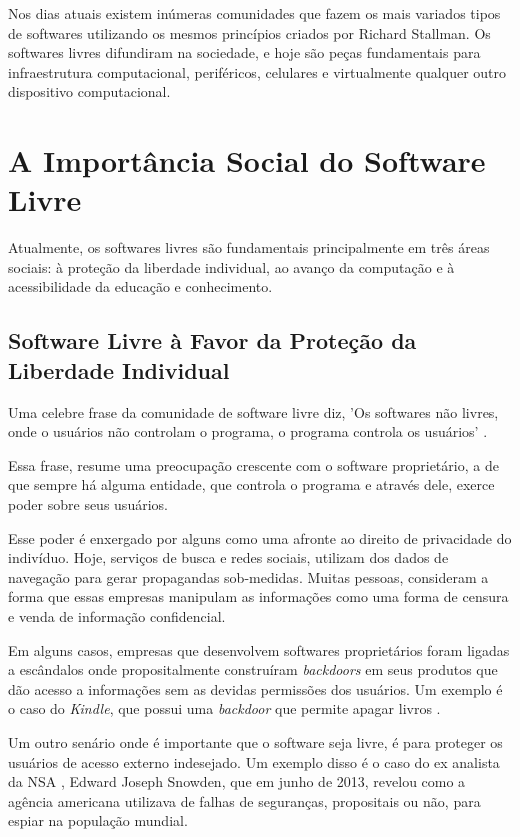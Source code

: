 Nos dias atuais existem inúmeras comunidades que fazem os mais variados tipos de softwares utilizando os mesmos princípios criados por Richard Stallman. Os softwares livres difundiram na sociedade, e hoje são peças fundamentais para infraestrutura computacional, periféricos, celulares e virtualmente qualquer outro dispositivo computacional.

\section{A Importância Social do Software Livre}
Atualmente, os softwares livres são fundamentais principalmente em três áreas sociais: à proteção da liberdade individual, ao avanço da computação e à acessibilidade da educação e conhecimento.

\subsection{Software Livre à Favor da Proteção da Liberdade Individual}
Uma celebre frase da comunidade de software livre diz, 'Os softwares não livres, onde o usuários não controlam o programa, o programa controla os usuários' \cite{Williams}. 

Essa frase, resume uma preocupação crescente com o software proprietário, a de que sempre há   alguma entidade, que controla o programa e através dele, exerce poder sobre seus usuários. 

Esse poder é enxergado por alguns como uma afronte ao direito de privacidade do indivíduo. Hoje, serviços de busca e redes sociais, utilizam dos dados de navegação para gerar propagandas sob-medidas.  Muitas pessoas, consideram a forma que essas empresas manipulam as informações como uma forma de censura e venda de informação confidencial. 

Em alguns casos, empresas que desenvolvem softwares proprietários foram ligadas a escândalos onde propositalmente construíram \textit{backdoors} em seus produtos que dão acesso a informações sem as devidas permissões dos usuários. Um exemplo é o caso do \textit{ Kindle}, que possui uma \textit{backdoor} que permite apagar livros \cite{GNUOperatingSystem} .

Um outro senário onde é importante que o software seja livre, é para proteger os usuários de acesso externo indesejado. Um exemplo disso é o caso do ex analista da NSA \cite{Tate2013}, Edward Joseph Snowden, que em junho de 2013, revelou como a agência americana utilizava de falhas de seguranças, propositais ou não, para espiar na população mundial. 

